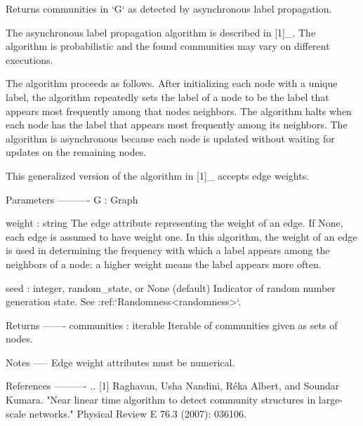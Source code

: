 \begin{DoxyVerb}Returns communities in `G` as detected by asynchronous label
propagation.

The asynchronous label propagation algorithm is described in
[1]_. The algorithm is probabilistic and the found communities may
vary on different executions.

The algorithm proceeds as follows. After initializing each node with
a unique label, the algorithm repeatedly sets the label of a node to
be the label that appears most frequently among that nodes
neighbors. The algorithm halts when each node has the label that
appears most frequently among its neighbors. The algorithm is
asynchronous because each node is updated without waiting for
updates on the remaining nodes.

This generalized version of the algorithm in [1]_ accepts edge
weights.

Parameters
----------
G : Graph

weight : string
    The edge attribute representing the weight of an edge.
    If None, each edge is assumed to have weight one. In this
    algorithm, the weight of an edge is used in determining the
    frequency with which a label appears among the neighbors of a
    node: a higher weight means the label appears more often.

seed : integer, random_state, or None (default)
    Indicator of random number generation state.
    See :ref:`Randomness<randomness>`.

Returns
-------
communities : iterable
    Iterable of communities given as sets of nodes.

Notes
-----
Edge weight attributes must be numerical.

References
----------
.. [1] Raghavan, Usha Nandini, Réka Albert, and Soundar Kumara. "Near
       linear time algorithm to detect community structures in large-scale
       networks." Physical Review E 76.3 (2007): 036106.
\end{DoxyVerb}
 \mbox{\label{namespacenetworkx_1_1algorithms_1_1community_1_1label__propagation_ac94ecb9149d068f63dc5ce1f53a53567}} 
